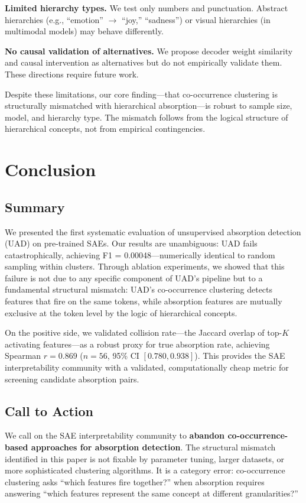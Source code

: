 \documentclass{article}
\begin{document}
\textbf{Limited hierarchy types.} We test only numbers and punctuation. Abstract hierarchies (e.g., ``emotion'' $\rightarrow$ ``joy,'' ``sadness'') or visual hierarchies (in multimodal models) may behave differently.

\textbf{No causal validation of alternatives.} We propose decoder weight similarity and causal intervention as alternatives but do not empirically validate them. These directions require future work.

Despite these limitations, our core finding---that co-occurrence clustering is structurally mismatched with hierarchical absorption---is robust to sample size, model, and hierarchy type. The mismatch follows from the logical structure of hierarchical concepts, not from empirical contingencies.

\section{Conclusion}
\label{sec:conclusion}

\subsection{Summary}

We presented the first systematic evaluation of unsupervised absorption detection (UAD) on pre-trained SAEs. Our results are unambiguous: UAD fails catastrophically, achieving F1 = 0.00048---numerically identical to random sampling within clusters. Through ablation experiments, we showed that this failure is not due to any specific component of UAD's pipeline but to a fundamental structural mismatch: UAD's co-occurrence clustering detects features that fire on the same tokens, while absorption features are mutually exclusive at the token level by the logic of hierarchical concepts.

On the positive side, we validated collision rate---the Jaccard overlap of top-$K$ activating features---as a robust proxy for true absorption rate, achieving Spearman $r = 0.869$ ($n = 56$, 95\% CI $[0.780, 0.938]$). This provides the SAE interpretability community with a validated, computationally cheap metric for screening candidate absorption pairs.

\subsection{Call to Action}

We call on the SAE interpretability community to \textbf{abandon co-occurrence-based approaches for absorption detection}. The structural mismatch identified in this paper is not fixable by parameter tuning, larger datasets, or more sophisticated clustering algorithms. It is a category error: co-occurrence clustering asks ``which features fire together?'' when absorption requires answering ``which features represent the same concept at different granularities?''
\end{document}
